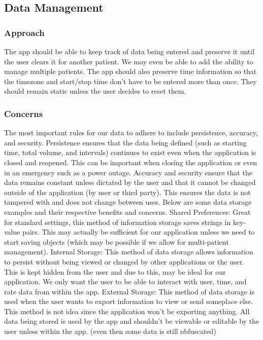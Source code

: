 \documentclass[onecolumn, draftclsnofoot,10pt, compsoc]{IEEEtran}
\begin{document}
\subsection{Data Management}
\subsubsection{Approach}
The app should be able to keep track of data being entered and preserve it until the user clears it for another patient. We may even be able to add the ability to manage multiple patients. The app should also preserve time information so that the timezone and start/stop time don't have to be entered more than once. They should remain static unless the user decides to reset them.
\subsubsection{Concerns}
The most important rules for our data to adhere to include persistence, accuracy, and security. Persistence ensures that the data being defined (such as starting time, total volume, and intervals) continues to exist even when the application is closed and reopened. This can be important when closing the application or even in an emergency such as a power outage. Accuracy and security ensure that the data remains constant unless dictated by the user and that it cannot be changed outside of the application (by user or third party). This ensures the data is not tampered with and does not change between uses. Below are some data storage examples and their respective benefits and concerns.
\newline
\newline
Shared Preferences: 
Great for standard settings, this method of information storage saves strings in key-value pairs. This may actually be sufficient for our application unless we need to start saving objects (which may be possible if we allow for multi-patient management).
\newline
\newline
Internal Storage: 
This method of data storage allows information to persist without being viewed or changed by other applications or the user. This is kept hidden from the user and due to this, may be ideal for our application. We only want the user to be able to interact with user, time, and rate data from within the app.
\newline
\newline
External Storage:
This method of data storage is used when the user wants to export information to view or send someplace else. This method is not idea since the application won't be exporting anything. All data being stored is used by the app and shouldn't be viewable or editable by the user unless within the app. (even then some data is still obfuscated)
\end{document}
